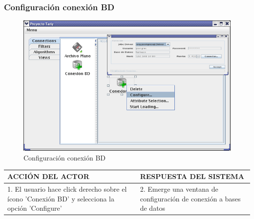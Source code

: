 \subsubsection{Configuraci\'on conexi\'on BD}
\begin{figure}[ht]
\centering
\includegraphics[width=1\textwidth]{images/08.png}
\caption{Configuraci\'on conexi\'on BD}
\end{figure}
\begin{center}
\begin{tabular}{|p{60mm}|p{60mm}|} \hline
ACCI\'ON DEL ACTOR & RESPUESTA DEL SISTEMA \\ \hline
1. El usuario hace click derecho sobre el \'icono 'Conexi\'on BD' y selecciona la opci\'on 'Configure'  & 2. Emerge una ventana de configuraci\'on de conexi\'on a bases de datos\\ \hline
\end{tabular}
\end{center}


\newpage
